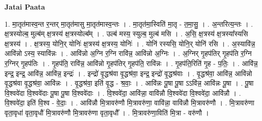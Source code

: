 \documentclass[17pt]{extarticle}
\begin{document}
\textbf{Jatai Paata} \newline

1. मा॒तृत॑मास्व॒न्त र॒न्तर् मा॒तृत॑मासु मा॒तृत॑मास्व॒न्तः । . मा॒तृत॑मा॒स्विति॑ मा॒तृ - त॒मा॒सु॒ । . अ॒न्तरित्य॒न्तः । . क्ष॒त्रस्योल्ब॒ मुल्ब॑म् क्ष॒त्रस्य॑ क्ष॒त्रस्योल्ब᳚म् । . उल्ब॑ मस्य॒ स्युल्ब॒ मुल्ब॑ मसि । . अ॒सि॒ क्ष॒त्रस्य॑ क्ष॒त्रस्या᳚स्यसि क्ष॒त्रस्य॑ । . क्ष॒त्रस्य॒ योनि॒र् योनिः॑ क्ष॒त्रस्य॑ क्ष॒त्रस्य॒ योनिः॑ । . योनि॑ रस्यसि॒ योनि॒र् योनि॑ रसि । . अ॒स्यावि॑न्न॒ आवि॑न्नो ऽस्य॒ स्यावि॑न्नः । . आवि॑न्नो अ॒ग्नि र॒ग्नि रावि॑न्न॒ आवि॑न्नो अ॒ग्निः । . अ॒ग्निर् गृ॒हप॑तिर् गृ॒हप॑ति र॒ग्नि र॒ग्निर् गृ॒हप॑तिः । . गृ॒हप॑ति॒ रावि॑न्न॒ आवि॑न्नो गृ॒हप॑तिर् गृ॒हप॑ति॒ रावि॑न्नः । . गृ॒हप॑ति॒रिति॑ गृ॒ह - प॒तिः॒ । . आवि॑न्न॒ इन्द्र॒ इन्द्र॒ आवि॑न्न॒ आवि॑न्न॒ इन्द्रः॑ । . इन्द्रो॑ वृ॒द्धश्र॑वा वृ॒द्धश्र॑वा॒ इन्द्र॒ इन्द्रो॑ वृ॒द्धश्र॑वाः । . वृ॒द्धश्र॑वा॒ आवि॑न्न॒ आवि॑न्नो वृ॒द्धश्र॑वा वृ॒द्धश्र॑वा॒ आवि॑न्नः । . वृ॒द्धश्र॑वा॒ इति॑ वृ॒द्ध - श्र॒वाः॒ । . आवि॑न्नः पू॒षा पू॒षा ऽऽवि॑न्न॒ आवि॑न्नः पू॒षा । . पू॒षा वि॒श्ववे॑दा वि॒श्ववे॑दाः पू॒षा पू॒षा वि॒श्ववे॑दाः । . वि॒श्ववे॑दा॒ आवि॑न्ना॒ वावि॑न्नौ वि॒श्ववे॑दा वि॒श्ववे॑दा॒ आवि॑न्नौ । . वि॒श्ववे॑दा॒ इति॑ वि॒श्व - वे॒दाः॒ । . आवि॑न्नौ मि॒त्रावरु॑णौ मि॒त्रावरु॑णा॒ वावि॑न्ना॒ वावि॑न्नौ मि॒त्रावरु॑णौ । . मि॒त्रावरु॑णा वृता॒वृधा॑ वृता॒वृधौ॑ मि॒त्रावरु॑णौ मि॒त्रावरु॑णा वृता॒वृधौ᳚ । . मि॒त्रावरु॑णा॒विति॑ मि॒त्रा - वरु॑णौ । \newline
\end{document}
